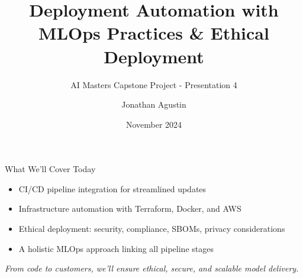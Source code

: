 \documentclass[aspectratio=169]{beamer}
\title{Deployment Automation with MLOps Practices \& Ethical Deployment}
\subtitle{AI Masters Capstone Project - Presentation 4}
\author{Jonathan Agustin}
\date{November 2024}
\begin{document}
%
%
\maketitle

%
%
\begin{frame}{What We’ll Cover Today}
\begin{itemize}
\item CI/CD pipeline integration for streamlined updates
\item Infrastructure automation with Terraform, Docker, and AWS
\item Ethical deployment: security, compliance, SBOMs, privacy considerations
\item A holistic MLOps approach linking all pipeline stages
\end{itemize}

\vspace{0.8em}
\emph{From code to customers, we’ll ensure ethical, secure, and scalable model delivery.}
\end{frame}
\end{document}
